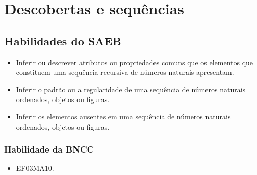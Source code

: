 \chapter{Descobertas e sequências}
\enlargethispage{\baselineskip}

\section*{Habilidades do SAEB}

\begin{itemize}
\item Inferir ou descrever atributos ou propriedades comuns que os elementos
que constituem uma sequência recursiva de números naturais apresentam.

\item Inferir o padrão ou a regularidade de uma sequência de números
naturais ordenados, objetos ou figuras.

\item Inferir os elementos ausentes em uma sequência de números naturais
ordenados, objetos ou figuras.
\end{itemize}

\subsection{Habilidade da BNCC}

\begin{itemize}
\item EF03MA10.
\end{itemize}


